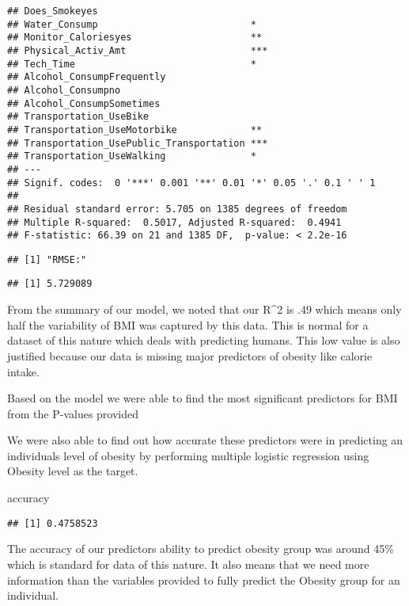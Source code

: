 \documentclass[
]{article}
\newenvironment{Shaded}{\begin{snugshade}}{\end{snugshade}}
\newcommand{\NormalTok}[1]{#1}
\begin{document}
\begin{verbatim}
## Does_Smokeyes                              
## Water_Consump                           *  
## Monitor_Caloriesyes                     ** 
## Physical_Activ_Amt                      ***
## Tech_Time                               *  
## Alcohol_ConsumpFrequently                  
## Alcohol_Consumpno                          
## Alcohol_ConsumpSometimes                   
## Transportation_UseBike                     
## Transportation_UseMotorbike             ** 
## Transportation_UsePublic_Transportation ***
## Transportation_UseWalking               *  
## ---
## Signif. codes:  0 '***' 0.001 '**' 0.01 '*' 0.05 '.' 0.1 ' ' 1
## 
## Residual standard error: 5.705 on 1385 degrees of freedom
## Multiple R-squared:  0.5017, Adjusted R-squared:  0.4941 
## F-statistic: 66.39 on 21 and 1385 DF,  p-value: < 2.2e-16
\end{verbatim}

\begin{verbatim}
## [1] "RMSE:"
\end{verbatim}

\begin{verbatim}
## [1] 5.729089
\end{verbatim}

From the summary of our model, we noted that our R\^{}2 is .49 which
means only half the variability of BMI was captured by this data. This
is normal for a dataset of this nature which deals with predicting
humans. This low value is also justified because our data is missing
major predictors of obesity like calorie intake.

Based on the model we were able to find the most significant predictors
for BMI from the P-values provided

We were also able to find out how accurate these predictors were in
predicting an individuals level of obesity by performing multiple
logistic regression using Obesity level as the target.

\begin{Shaded}
\begin{Highlighting}[]
\NormalTok{accuracy}
\end{Highlighting}
\end{Shaded}

\begin{verbatim}
## [1] 0.4758523
\end{verbatim}

The accuracy of our predictors ability to predict obesity group was
around 45\% which is standard for data of this nature. It also means
that we need more information than the variables provided to fully
predict the Obesity group for an individual.
\end{document}
